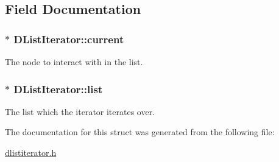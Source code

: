 \subsection{Field Documentation}
\subsubsection[{\texorpdfstring{current}{current}}]{$\ast$ D\+List\+Iterator\+::current}\hypertarget{structDListIterator_a5f347829fbf97fb211160150628db997}{}\label{structDListIterator_a5f347829fbf97fb211160150628db997}
The node to interact with in the list. 
\subsubsection[{\texorpdfstring{list}{list}}]{$\ast$ D\+List\+Iterator\+::list}\hypertarget{structDListIterator_ad948282c06cc2a1c796699443404c73f}{}\label{structDListIterator_ad948282c06cc2a1c796699443404c73f}
The list which the iterator iterates over. 

The documentation for this struct was generated from the following file\+:\begin{DoxyCompactItemize}
\item 
\hyperlink{dlistiterator_8h}{dlistiterator.\+h}\end{DoxyCompactItemize}
